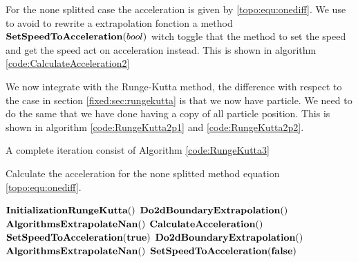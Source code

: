 For the none splitted case the acceleration is given by \ref{topo:equ:onediff}.
We use to avoid to rewrite a extrapolation fonction a method $\mathop{\textbf{SetSpeedToAcceleration}}(bool)$
witch toggle that the method to set the speed and get the speed act on acceleration instead.
This is shown in algorithm \ref{code:CalculateAcceleration2}

We now integrate with the Runge-Kutta method, the difference with respect to the case in section \ref{fixed:sec:rungekutta}
is that we now have particle. We need to do the same that we have done having a copy of all particle position.
This is shown in algorithm \ref{code:RungeKutta2p1} and \ref{code:RungeKutta2p2}.

A complete iteration consist of Algorithm \ref{code:RungeKutta3}

\begin{algorithm}
\caption{Calculate the acceleration for the none splitted method equation \ref{topo:equ:onediff}.}
\label{code:CalculateAcceleration2}
\begin{algorithmic}[1]
	\State $\mathop{\textbf{InitializationRungeKutta}}()$
	\State $\mathop{\textbf{Do2dBoundaryExtrapolation}}()$
	\State $\mathop{\textbf{AlgorithmsExtrapolateNan}}()$
	\State $\mathop{\textbf{CalculateAcceleration}}()$
	\State $\mathop{\textbf{SetSpeedToAcceleration}}(\mathop{\textbf{true}})$
	\State $\mathop{\textbf{Do2dBoundaryExtrapolation}}()$
	\State $\mathop{\textbf{AlgorithmsExtrapolateNan}}()$
	\State $\mathop{\textbf{SetSpeedToAcceleration}}(\mathop{\textbf{false}})$
\EndProcedure
        \end{algorithmic}
\end{algorithm}


